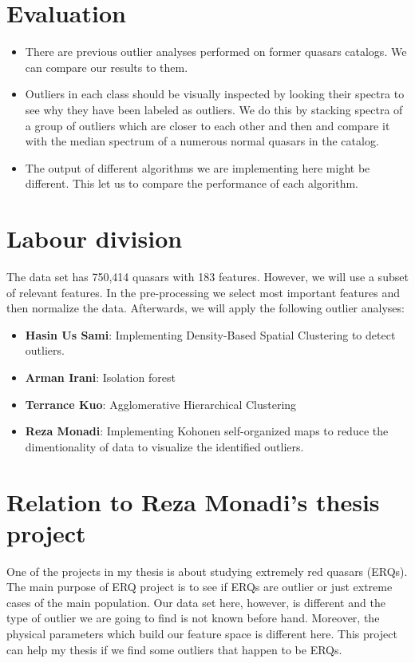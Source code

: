 \documentclass[usenatbib,a4paper,fleqn]{article}
\begin{document}
\section*{Evaluation }
\begin{itemize}
   \item  There are previous outlier analyses performed on former quasars catalogs. We can compare our results to them. 
   \item  Outliers in each class should be visually inspected by looking their spectra to see why they have been labeled as outliers. We do this by
   stacking spectra of a group of outliers which are closer to each other and then and compare 
   it with the median spectrum of a numerous normal quasars in the catalog. 
   \item The output of different algorithms we are implementing here might be different. This let us to compare the performance of each algorithm. 
\end{itemize}  


\section*{ Labour division}

The data set has 750,414 quasars with 183 features. However, we will use a subset of relevant features.
In the pre-processing we select most important features and then normalize the data. Afterwards, we will apply the following outlier analyses:
\begin{itemize}
 
\item \textbf{Hasin Us Sami}: Implementing Density-Based Spatial Clustering to detect outliers.
\item \textbf{Arman Irani}: Isolation forest
\item \textbf{Terrance Kuo}: Agglomerative Hierarchical Clustering
\item  \textbf{Reza Monadi}: Implementing Kohonen self-organized maps to reduce the dimentionality of data to visualize the 
identified outliers.

\end{itemize}
\section*{Relation to Reza Monadi's thesis project}
One of the projects in my thesis is about studying extremely
 red quasars (ERQs). The main purpose of ERQ project is to see if
  ERQs are outlier or just extreme cases of the main population. 
  Our data set here, however, is different and the type of outlier 
  we are going to find is not known before hand. Moreover, the physical 
  parameters which build our feature space is different here. 
  This project can help my thesis if we find some outliers that happen to be ERQs. 
\end{document}
